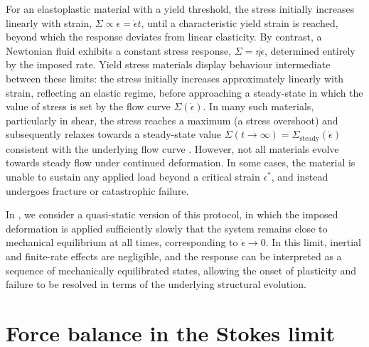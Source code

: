 \documentclass[asymmetricmargins]{library/duthesis}%
\providecommand{\DIFadd}[1]{{\protect\color{blue}\uwave{#1}}} %
\providecommand{\DIFaddbegin}{} %
\providecommand{\DIFaddend}{} %
\begin{document}
\DIFaddend For an elastoplastic material with a yield threshold, the stress initially increases linearly with strain, $\Sigma \propto \epsilon = \dot{\epsilon} t$, until a characteristic yield strain is reached, beyond which the response deviates from linear elasticity. By contrast, a Newtonian fluid exhibits a constant stress response, $\Sigma = \eta \dot{\epsilon}$, determined entirely by the imposed rate\DIFaddbegin \DIFadd{,where $\eta$ is the fluid viscosity}\DIFaddend . Yield stress materials display behaviour intermediate between these limits: the stress initially increases approximately linearly with strain, reflecting an elastic regime, before approaching a steady-state in which the value of stress is set by the flow curve $\Sigma(\dot{\epsilon})$. In many such materials, particularly in shear, the stress reaches a maximum (a stress overshoot) and subsequently relaxes towards a steady-state value $\Sigma(t \to \infty) = \Sigma_{\mathrm{steady}}(\dot{\epsilon})$ consistent with the underlying flow curve \cite{divouxShearBandingComplex2016,larson_structure_1999}. However, not all materials evolve towards steady flow under continued deformation. In some cases, the material is unable to sustain any applied load beyond a critical strain $\epsilon^*$, and instead undergoes fracture or catastrophic failure.

In , we consider a quasi-static version of this protocol, in which the imposed deformation is applied sufficiently slowly that the system remains close to mechanical equilibrium at all times, corresponding to $\dot{\epsilon} \to 0$. In this limit, inertial and finite-rate effects are negligible, and the response can be interpreted as a sequence of mechanically equilibrated states, allowing the onset of plasticity and failure to be resolved in terms of the underlying structural evolution.



\section{Force balance in the Stokes limit} \label{sec:Hydrodynamics}
\end{document}
